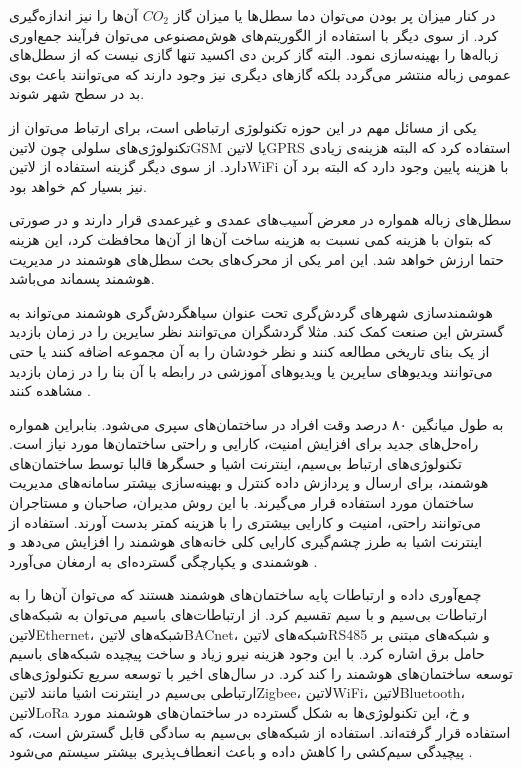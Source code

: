 در کنار میزان پر بودن می‌توان دما سطل‌ها یا میزان گاز $CO_{2}$ آن‌ها را نیز اندازه‌گیری کرد. از سوی دیگر با استفاده از الگوریتم‌های هوش‌مصنوعی می‌توان فرآیند جمع‌اوری زباله‌ها را بهینه‌سازی نمود.
البته گاز کربن دی اکسید تنها گازی نیست که از سطل‌های عمومی زباله منتشر می‌گردد بلکه گازهای دیگری نیز وجود دارند که می‌توانند باعث بوی بد در سطح شهر شوند.

یکی از مسائل مهم در این حوزه تکنولوژی ارتباطی است، برای ارتباط می‌توان از تکنولوژی‌های سلولی چون ‌لاتین{GSM} یا ‌لاتین{GPRS} استفاده کرد که البته هزینه‌ی زیادی دارد.
از سوی دیگر گزینه استفاده از ‌لاتین{WiFi} با هزینه پایین وجود دارد که البته برد آن نیز بسیار کم خواهد بود.

سطل‌های زباله همواره در معرض آسیب‌های عمدی و غیرعمدی قرار دارند و در صورتی که بتوان با هزینه کمی نسبت به هزینه ساخت آن‌ها از آن‌ها محافظت کرد، این هزینه حتما ارزش خواهد شد.
این امر یکی از محرک‌های بحث سطل‌های هوشمند در مدیریت هوشمند پسماند می‌باشد.

هوشمند‌سازی شهرهای گردش‌گری تحت عنوان ‌سیاه{گردش‌گری هوشمند} می‌تواند به گسترش این صنعت کمک کند. مثلا گردشگران می‌توانند نظر سایرین را در زمان بازدید از یک بنای تاریخی مطالعه کنند و نظر خودشان را به آن مجموعه اضافه کنند
یا حتی می‌توانند ویدیوهای سایرین یا ویدیوهای آموزشی در رابطه با آن بنا را در زمان بازدید مشاهده کنند
.


به طول میانگین ۸۰ درصد وقت افراد در ساختمان‌های سپری می‌شود. بنابراین همواره راه‌حل‌های جدید برای افزایش
امنیت، کارایی و راحتی ساختمان‌ها مورد نیاز است.
تکنولوژی‌های ارتباط بی‌سیم، اینترنت اشیا و حسگرها قالبا توسط ساختمان‌های هوشمند، برای
 ارسال و پردازش داده
 کنترل و بهینه‌سازی بیشتر سامانه‌های مدیریت ساختمان
مورد استفاده قرار می‌گیرند.
با این روش مدیران، صاحبان و مستاجران می‌توانند راحتی، امنیت و کارایی بیشتری را با هزینه کمتر بدست آورند.
استفاده از اینترنت اشیا به طرز چشم‌گیری کارایی کلی خانه‌های هوشمند را افزایش می‌دهد و هوشمندی و یکپارچگی
گسترده‌ای به ارمغان می‌آورد
.

چمع‌آوری داده و ارتباطات پایه ساختمان‌های هوشمند هستند که می‌توان آن‌ها را به ارتباطات بی‌سیم و با سیم تقسیم کرد.
از ارتباطات‌های باسیم می‌توان به شبکه‌های ‌لاتین{Ethernet}، شبکه‌های ‌لاتین{BACnet}، شبکه‌های ‌لاتین{RS485}
و شبکه‌های مبتنی بر حامل برق اشاره کرد. با این وجود هزینه نیرو زیاد و ساخت پیچیده شبکه‌های باسیم توسعه ساختمان‌های هوشمند را
کند کرد. در سال‌های اخیر با توسعه سریع تکنولوژی‌های ارتباطی بی‌سیم در اینترنت اشیا مانند ‌لاتین{Zigbee}، ‌لاتین{WiFi}،
‌لاتین{Bluetooth}، ‌لاتین{LoRa} و ‌خ، این تکنولوژی‌ها به شکل گسترده در ساختمان‌های هوشمند مورد استفاده قرار گرفته‌اند.
استفاده از شبکه‌های بی‌سیم به سادگی قابل گسترش است، که پیچیدگی سیم‌کشی را کاهش داده و باعث انعطاف‌پذیری بیشتر سیستم می‌شود
.


